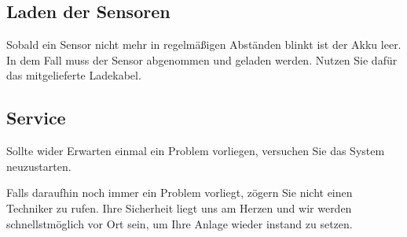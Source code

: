 \documentclass[a4paper,12pt]{article}
\begin{document}
\subsection{Laden der Sensoren}
Sobald ein Sensor nicht mehr in regelmäßigen Abständen blinkt ist der Akku leer. In dem Fall muss der Sensor abgenommen und geladen werden. Nutzen Sie dafür das mitgelieferte Ladekabel.

\subsection{Service}
Sollte wider Erwarten einmal ein Problem vorliegen, versuchen Sie das System neuzustarten.\par
Falls daraufhin noch immer ein Problem vorliegt, zögern Sie nicht einen Techniker zu rufen. Ihre Sicherheit liegt uns am Herzen und wir werden schnellstmöglich vor Ort sein, um Ihre Anlage wieder instand zu setzen.


\newpage

\end{document}
